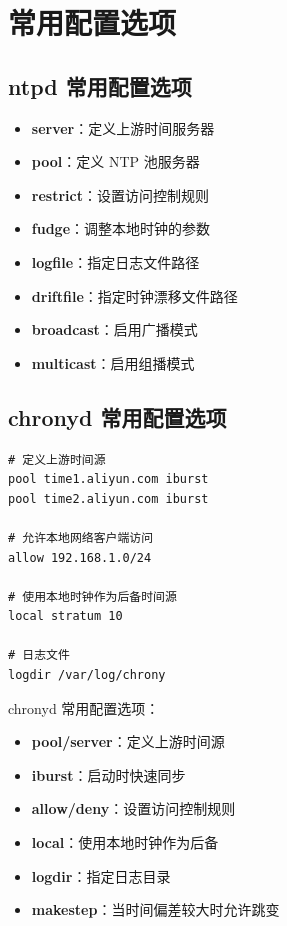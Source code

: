 \documentclass[12pt,UTF8]{ctexbook}
\begin{document}
\section{常用配置选项}
\label{sec:common_options}

\subsection{ntpd 常用配置选项}

\begin{itemize}
    \item \textbf{server}：定义上游时间服务器
    \item \textbf{pool}：定义 NTP 池服务器
    \item \textbf{restrict}：设置访问控制规则
    \item \textbf{fudge}：调整本地时钟的参数
    \item \textbf{logfile}：指定日志文件路径
    \item \textbf{driftfile}：指定时钟漂移文件路径
    \item \textbf{broadcast}：启用广播模式
    \item \textbf{multicast}：启用组播模式
\end{itemize}

\subsection{chronyd 常用配置选项}

\begin{verbatim}
# 定义上游时间源
pool time1.aliyun.com iburst
pool time2.aliyun.com iburst

# 允许本地网络客户端访问
allow 192.168.1.0/24

# 使用本地时钟作为后备时间源
local stratum 10

# 日志文件
logdir /var/log/chrony
\end{verbatim}

chronyd 常用配置选项：
\begin{itemize}
    \item \textbf{pool/server}：定义上游时间源
    \item \textbf{iburst}：启动时快速同步
    \item \textbf{allow/deny}：设置访问控制规则
    \item \textbf{local}：使用本地时钟作为后备
    \item \textbf{logdir}：指定日志目录
    \item \textbf{makestep}：当时间偏差较大时允许跳变
\end{itemize}
\end{document}
